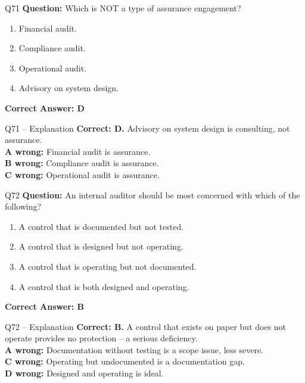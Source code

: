 \documentclass[aspectratio=169,10pt]{beamer}
\begin{document}
	\begin{frame}[t]{Q71}
		\small
		\textbf{Question:} Which is NOT a type of assurance engagement?
		\begin{enumerate}[label=\Alph*.,itemsep=1pt,topsep=2pt]
			\item Financial audit.
			\item Compliance audit.
			\item Operational audit.
			\item Advisory on system design.
		\end{enumerate}
		\vspace{4pt}
		\textbf{Correct Answer: D}
	\end{frame}
	
	\begin{frame}[t]{Q71 -- Explanation}
		\small
		\textbf{Correct: D.} Advisory on system design is consulting, not assurance. \\[4pt]
		\textbf{A wrong:} Financial audit is assurance. \\[2pt]
		\textbf{B wrong:} Compliance audit is assurance. \\[2pt]
		\textbf{C wrong:} Operational audit is assurance.
	\end{frame}
	
	\begin{frame}[t]{Q72}
		\small
		\textbf{Question:} An internal auditor should be most concerned with which of the following?
		\begin{enumerate}[label=\Alph*.,itemsep=1pt,topsep=2pt]
			\item A control that is documented but not tested.
			\item A control that is designed but not operating.
			\item A control that is operating but not documented.
			\item A control that is both designed and operating.
		\end{enumerate}
		\vspace{4pt}
		\textbf{Correct Answer: B}
	\end{frame}
	
	\begin{frame}[t]{Q72 -- Explanation}
		\small
		\textbf{Correct: B.} A control that exists on paper but does not operate provides no protection -- a serious deficiency. \\[4pt]
		\textbf{A wrong:} Documentation without testing is a scope issue, less severe. \\[2pt]
		\textbf{C wrong:} Operating but undocumented is a documentation gap. \\[2pt]
		\textbf{D wrong:} Designed and operating is ideal.
	\end{frame}
	
\end{document}
